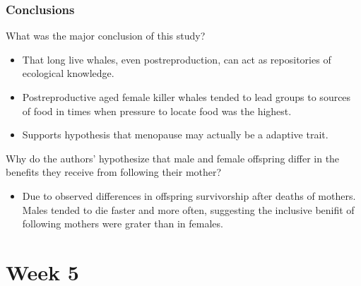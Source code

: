 \documentclass[12pt,a4paper]{article}
\begin{document}
\subsubsection{Conclusions}
\begin{itemize}
    {\color{G-Moon}\item What was the major conclusion of this study?}
        \begin{itemize}
            \item That long live whales, even postreproduction, can act as repositories of ecological knowledge.
            \item Postreproductive aged female killer whales tended to lead groups to sources of food in times when pressure to locate food was the highest. 
            \item Supports hypothesis that menopause may actually be a adaptive trait.
        \end{itemize}
    {\color{G-Moon}\item Why do the authors’ hypothesize that male and female offspring differ in the benefits they receive from following their mother?}
        \begin{itemize}
            \item Due to observed differences in offspring survivorship after deaths of mothers. Males tended to die faster and more often, suggesting the inclusive benifit of following mothers were grater than in females.
        \end{itemize}
\end{itemize}

\clearpage
\section*{Week 5}

\end{document}

